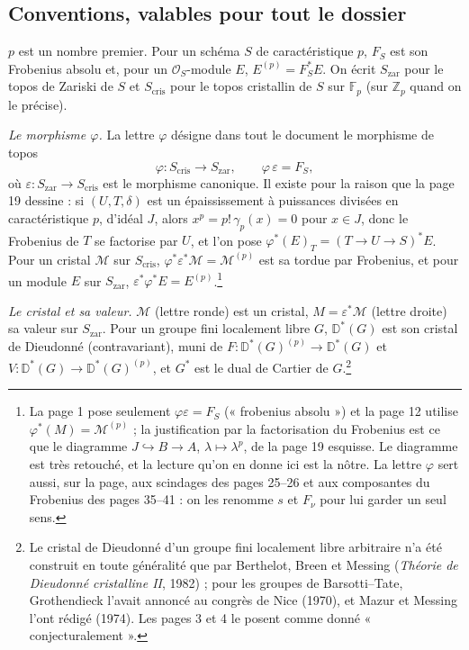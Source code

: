 \documentclass[11pt,a4paper]{article}
\begin{document}
\subsection*{Conventions, valables pour tout le dossier}

$p$ est un nombre premier. Pour un schéma $S$ de caractéristique $p$, $F_{S}$
est son Frobenius absolu et, pour un $\mathcal{O}_{S}$-module $E$,
$E^{(p)} = F_{S}^{*}E$. On écrit $S_{\mathrm{zar}}$ pour le topos de Zariski de
$S$ et $S_{\mathrm{cris}}$ pour le topos cristallin de $S$ sur
$\mathbb{F}_{p}$ (sur $\mathbb{Z}_{p}$ quand on le précise).

\emph{Le morphisme $\varphi$.} La lettre $\varphi$ désigne dans tout le
document le morphisme de topos
\[
\varphi\colon S_{\mathrm{cris}} \longrightarrow S_{\mathrm{zar}},
\qquad \varphi\,\varepsilon = F_{S},
\]
où $\varepsilon\colon S_{\mathrm{zar}} \to S_{\mathrm{cris}}$ est le
morphisme canonique. Il existe pour la raison que la page 19 dessine : si
$(U, T, \delta)$ est un épaississement à puissances divisées en
caractéristique $p$, d'idéal $J$, alors $x^{p} = p!\,\gamma_{p}(x) = 0$ pour
$x \in J$, donc le Frobenius de $T$ se factorise par $U$, et l'on pose
$\varphi^{*}(E)_{T} = (T \to U \to S)^{*}E$. Pour un cristal $\mathcal{M}$
sur $S_{\mathrm{cris}}$, $\varphi^{*}\varepsilon^{*}\mathcal{M} =
\mathcal{M}^{(p)}$ est sa tordue par Frobenius, et pour un module $E$ sur
$S_{\mathrm{zar}}$, $\varepsilon^{*}\varphi^{*}E = E^{(p)}$.\footnote{La page
1 pose seulement $\varphi\varepsilon = F_{S}$ (« frobenius absolu ») et la
page 12 utilise $\varphi^{*}(M) = \mathcal{M}^{(p)}$ ; la justification par
la factorisation du Frobenius est ce que le diagramme $J \hookrightarrow B
\to A$, $\lambda \mapsto \lambda^{p}$, de la page 19 esquisse. Le diagramme
est très retouché, et la lecture qu'on en donne ici est la nôtre. La lettre
$\varphi$ sert aussi, sur la page, aux scindages des pages 25--26 et aux
composantes du Frobenius des pages 35--41 : on les renomme $s$ et $F_{\nu}$
pour lui garder un seul sens.}

\emph{Le cristal et sa valeur.} $\mathcal{M}$ (lettre ronde) est un cristal,
$M = \varepsilon^{*}\mathcal{M}$ (lettre droite) sa valeur sur
$S_{\mathrm{zar}}$. Pour un groupe fini localement libre $G$,
$\mathbb{D}^{*}(G)$ est son cristal de Dieudonné (contravariant), muni de
$F\colon \mathbb{D}^{*}(G)^{(p)} \to \mathbb{D}^{*}(G)$ et
$V\colon \mathbb{D}^{*}(G) \to \mathbb{D}^{*}(G)^{(p)}$, et $G^{*}$ est le
dual de Cartier de $G$.\footnote{Le cristal de Dieudonné d'un groupe fini
localement libre arbitraire n'a été construit en toute généralité que par
Berthelot, Breen et Messing (\emph{Théorie de Dieudonné cristalline II},
1982) ; pour les groupes de Barsotti--Tate, Grothendieck l'avait annoncé au
congrès de Nice (1970), et Mazur et Messing l'ont rédigé (1974). Les pages 3
et 4 le posent comme donné « conjecturalement ».}
\end{document}
